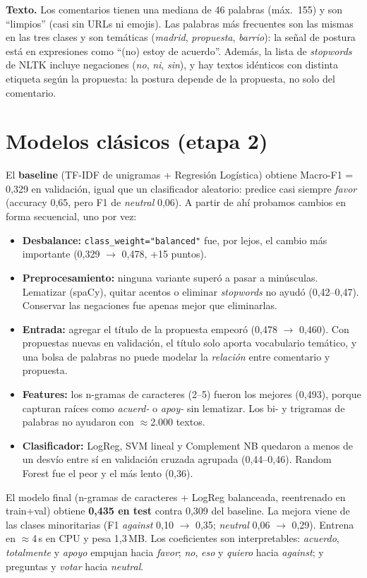 \documentclass[10pt,a4paper]{article}
\newcommand{\cod}[1]{\texttt{\small #1}}
\begin{document}
\textbf{Texto.} Los comentarios tienen una mediana de 46 palabras (máx.\ 155) y son ``limpios'' (casi sin URLs ni emojis). Las palabras más frecuentes son las mismas en las tres clases y son temáticas (\emph{madrid}, \emph{propuesta}, \emph{barrio}): la señal de postura está en expresiones como ``(no) estoy de acuerdo''. Además, la lista de \emph{stopwords} de NLTK incluye negaciones (\emph{no}, \emph{ni}, \emph{sin}), y hay textos idénticos con distinta etiqueta según la propuesta: la postura depende de la propuesta, no solo del comentario.

\section{Modelos clásicos (etapa 2)}

El \textbf{baseline} (TF-IDF de unigramas + Regresión Logística) obtiene Macro-F1 = 0,329 en validación, igual que un clasificador aleatorio: predice casi siempre \emph{favor} (accuracy 0,65, pero F1 de \emph{neutral} 0,06). A partir de ahí probamos cambios en forma secuencial, uno por vez:
\begin{itemize}
  \item \textbf{Desbalance:} \cod{class\_weight="balanced"} fue, por lejos, el cambio más importante (0,329 $\rightarrow$ 0,478, +15 puntos).
  \item \textbf{Preprocesamiento:} ninguna variante superó a pasar a minúsculas. Lematizar (spaCy), quitar acentos o eliminar \emph{stopwords} no ayudó (0,42--0,47). Conservar las negaciones fue apenas mejor que eliminarlas.
  \item \textbf{Entrada:} agregar el título de la propuesta empeoró (0,478 $\rightarrow$ 0,460). Con propuestas nuevas en validación, el título solo aporta vocabulario temático, y una bolsa de palabras no puede modelar la \emph{relación} entre comentario y propuesta.
  \item \textbf{Features:} los n-gramas de caracteres (2--5) fueron los mejores (0,493), porque capturan raíces como \emph{acuerd-} o \emph{apoy-} sin lematizar. Los bi- y trigramas de palabras no ayudaron con $\approx$2.000 textos.
  \item \textbf{Clasificador:} LogReg, SVM lineal y Complement NB quedaron a menos de un desvío entre sí en validación cruzada agrupada (0,44--0,46). Random Forest fue el peor y el más lento (0,36).
\end{itemize}
El modelo final (n-gramas de caracteres + LogReg balanceada, reentrenado en train+val) obtiene \textbf{0,435 en test} contra 0,309 del baseline. La mejora viene de las clases minoritarias (F1 \emph{against} 0,10 $\rightarrow$ 0,35; \emph{neutral} 0,06 $\rightarrow$ 0,29). Entrena en $\approx$4\,s en CPU y pesa 1,3\,MB. Los coeficientes son interpretables: \emph{acuerdo}, \emph{totalmente} y \emph{apoyo} empujan hacia \emph{favor}; \emph{no}, \emph{eso} y \emph{quiero} hacia \emph{against}; y preguntas y \emph{votar} hacia \emph{neutral}.
\end{document}

